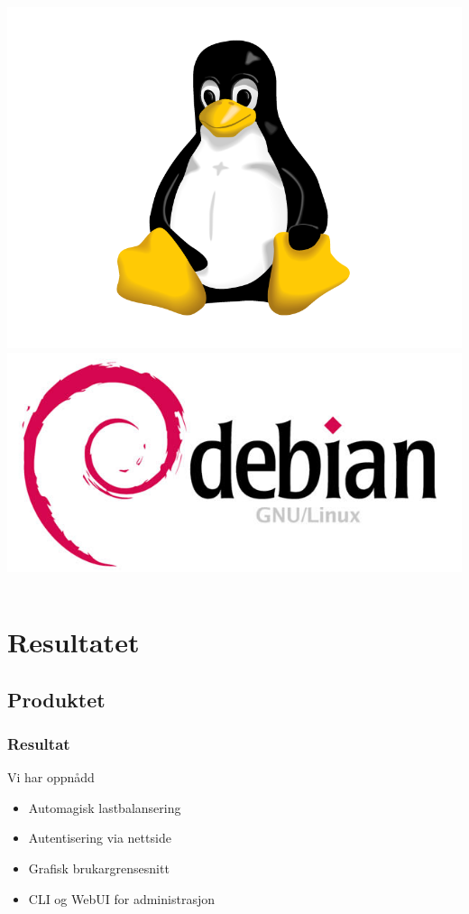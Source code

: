 \documentclass[nynorsk,14pt]{beamer}
\begin{document}
\begin{frame}
\begin{columns}[t]
\begin{column}[T]{4cm}
\begin{flushright}
		\includegraphics[scale=0.05]{imgs/tux-trans.png}
		\includegraphics[scale=0.1]{imgs/debian-logo.jpg}
	\end{flushright}
	\end{column}
	\end{columns}

\end{frame}

\section{Resultatet}
\subsection*{Produktet}
\begin{frame} %
	\frametitle{Resultat}
	Vi har oppnådd 
	\begin{itemize}
		\item Automagisk lastbalansering
		\item Autentisering via nettside
		\item Grafisk brukargrensesnitt
		\item CLI og WebUI for administrasjon
	\end{itemize}

\end{frame}
\end{document}
